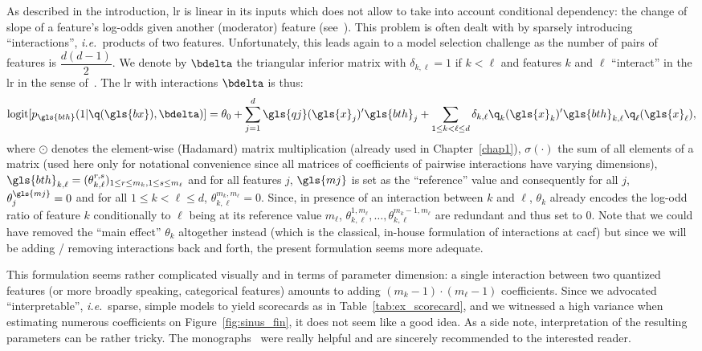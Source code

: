 As described in the introduction, \gls{lr} is linear in its inputs which does not allow to take into account conditional dependency: the change of slope of a feature's log-odds given another (moderator) feature (see~\cite{berry2010testing}). This problem is often dealt with by sparsely introducing ``interactions'', \textit{i.e.}\ products of two features. Unfortunately, this leads again to a model selection challenge as the number of pairs of features is $\dfrac{d(d-1)}{2}$. We denote by $\bdelta$ the triangular inferior matrix with $\delta_{k,\ell} = 1$ if $k < \ell$ and features $k$ and $\ell$ ``interact'' in the \gls{lr} in the sense of~\cite{berry2010testing}. The \gls{lr} with interactions $\bdelta$ is thus:
\begin{equation} \label{eq:reglog_sans}
\text{logit}[p_{\gls{bth}}(1|\q(\gls{bx}),\bdelta)] = \theta_{0} + \sum_{j=1}^d \gls{qj}(\gls{x}_j)' \gls{bth}_j + \sum_{1 \leq k < \ell \leq d} \delta_{k,\ell} \q_k(\gls{x}_k)' \gls{bth}_{k,\ell} \q_\ell(\gls{x}_\ell),
\end{equation}
where $\odot$ denotes the element-wise (Hadamard) matrix multiplication (already used in Chapter~\ref{chap1}), $\sigma(\cdot)$ the sum of all elements of a matrix (used here only for notational convenience since all matrices of coefficients of pairwise interactions have varying dimensions), $\gls{bth}_{k,\ell} = (\theta_{k,\ell}^{r,s})_{1 \leq r \leq m_k, 1 \leq s \leq m_\ell}$ and for all features $j$, $\gls{mj}$ is set as the ``reference'' value and consequently for all $j$, $\theta_{j}^{\gls{mj}}=0$ and for all $1 \leq k < \ell \leq d$, $\theta_{k,\ell}^{m_k,m_{\ell}}=0$. Since, in presence of an interaction between $k$ and $\ell$, $\theta_{k}$ already encodes the log-odd ratio of feature $k$ conditionally to $\ell$ being at its reference value $m_\ell$, $\theta_{k,\ell}^{1,m_\ell},\dots,\theta_{k,\ell}^{m_k-1,m_\ell}$ are redundant and thus set to $0$. Note that we could have removed the ``main effect'' $\theta_k$ altogether instead (which is the classical, in-house formulation of interactions at \gls{cacf}) but since we will be adding / removing interactions back and forth, the present formulation seems more adequate.

This formulation seems rather complicated visually and in terms of parameter dimension: a single interaction between two quantized features (or more broadly speaking, categorical features) amounts to adding $(m_k - 1) \cdot (m_\ell - 1)$ coefficients. Since we advocated ``interpretable'', \textit{i.e.}\ sparse, simple models to yield scorecards as in Table~\ref{tab:ex_scorecard}, and we witnessed a high variance when estimating numerous coefficients on Figure~\ref{fig:sinus_fin}, it does not seem like a good idea. As a side note, interpretation of the resulting parameters can be rather tricky. The monographs~\cite{jaccard2003interaction,james2001interaction} were really helpful and are sincerely recommended to the interested reader.

